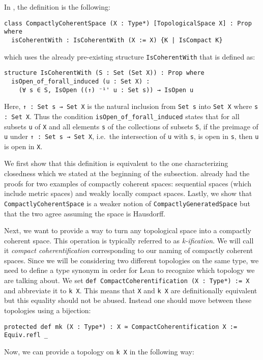 In \mathlib, the definition is the following: 

\begin{lstlisting}[frame=single]
class CompactlyCoherentSpace (X : Type*) [TopologicalSpace X] : Prop where
  isCoherentWith : IsCoherentWith (X := X) {K | IsCompact K}
\end{lstlisting}

which uses the already pre-existing structure \lstinline|IsCoherentWith| that is defined as: 

\begin{lstlisting}[frame=single]
structure IsCoherentWith (S : Set (Set X)) : Prop where
  isOpen_of_forall_induced (u : Set X) : 
    (∀ s ∈ S, IsOpen ((↑) ⁻¹' u : Set s)) → IsOpen u
\end{lstlisting}

Here, \lstinline|↑ : Set s → Set X| is the natural inclusion from \lstinline|Set s| into \lstinline|Set X| where \lstinline|s : Set X|. 
Thus the condition \lstinline|isOpen_of_forall_induced| states that for all subsets \lstinline|u| of \lstinline|X| and all elements \lstinline|s| of the collections of subsets \lstinline|S|, if the preimage of \lstinline|u| under \lstinline|↑ : Set s → Set X|, i.e.\ the intersection of \lstinline|u| with \lstinline|s|, is open in \lstinline|s|, then \lstinline|u| is open in \lstinline|X|.

We first show that this definition is equivalent to the one characterizing closedness which we stated at the beginning of the subsection. 
\mathlib already had the proofs for two examples of compactly coherent spaces: sequential spaces (which include metric spaces) and weakly locally compact spaces. 
Lastly, we show that \lstinline|CompactlyCoherentSpace| is a weaker notion of \lstinline|CompactlyGeneratedSpace| but that the two agree assuming the space is Hausdorff.

Next, we want to provide a way to turn any topological space into a compactly coherent space. 
This operation is typically referred to as \emph{k-ification}. 
We will call it \emph{compact coherentification} corresponding to our naming of compactly coherent spaces. 
Since we will be considering two different topologies on the same type, we need to define a type synonym in order for Lean to recognize which topology we are talking about. 
We set \lstinline|def CompactCoherentification (X : Type*) := X| and abbreviate it to \lstinline|k X|. 
This means that \lstinline|X| and \lstinline|k X| are definitionally equivalent but this equality should not be abused. 
Instead one should move between these topologies using a bijection: 
\begin{lstlisting}[frame=single]
protected def mk (X : Type*) : X ≃ CompactCoherentification X := Equiv.refl _
\end{lstlisting}
Now, we can provide a topology on \lstinline|k X| in the following way: 

